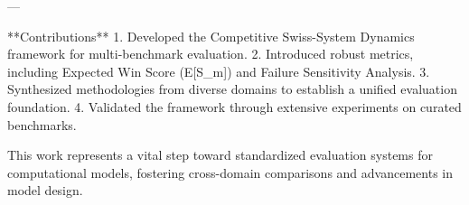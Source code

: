 ---

**Contributions**  
1. Developed the Competitive Swiss-System Dynamics framework for multi-benchmark evaluation.  
2. Introduced robust metrics, including Expected Win Score (E[S_m]) and Failure Sensitivity Analysis.  
3. Synthesized methodologies from diverse domains to establish a unified evaluation foundation.  
4. Validated the framework through extensive experiments on curated benchmarks.  

This work represents a vital step toward standardized evaluation systems for computational models, fostering cross-domain comparisons and advancements in model design.